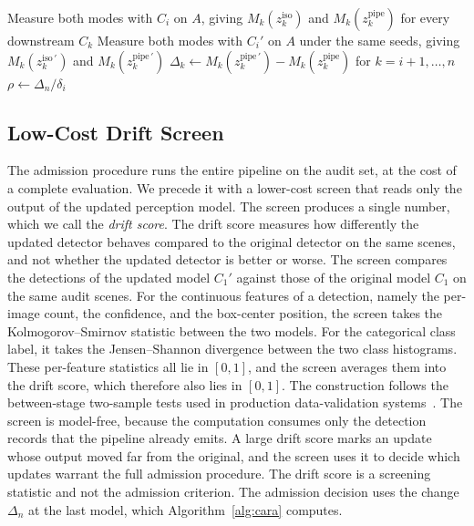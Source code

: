 \documentclass[conference]{IEEEtran}
\begin{document}
\begin{algorithm}[htbp]
\SetAlgoLined
\DontPrintSemicolon
{}
Measure both modes with $C_i$ on $A$, giving $M_k(z_k^{\text{iso}})$ and
$M_k(z_k^{\text{pipe}})$ for every downstream $C_k$\;
Measure both modes with $C_i'$ on $A$ under the same seeds, giving
$M_k(z_k^{\text{iso}\,\prime})$ and $M_k(z_k^{\text{pipe}\,\prime})$\;
$\Delta_k \leftarrow M_k(z_k^{\text{pipe}\,\prime}) - M_k(z_k^{\text{pipe}})$
\quad for $k=i{+}1,\dots,n$\;
$\rho \leftarrow \Delta_n / \delta_i$\;
\caption{Cascade-Aware Retraining Assessment (CARA)}
\label{alg:cara}
\end{algorithm}

\subsection{Low-Cost Drift Screen}
\label{sec:cara-frontend}
The admission procedure runs the entire pipeline on the audit set, at the cost of a
complete evaluation. We precede it with a lower-cost screen that reads only the
output of the updated perception model. The screen produces a single number, which
we call the \emph{drift score}. The drift score measures how differently the
updated detector behaves compared to the original detector on the same scenes, and
not whether the updated detector is better or worse. The screen compares the detections of the
updated model $C_1'$ against those of the original model $C_1$ on the same audit
scenes. For the continuous features of a detection, namely the per-image count, the
confidence, and the box-center position, the screen takes the Kolmogorov--Smirnov
statistic between the two models. For the categorical class label, it takes the
Jensen--Shannon divergence between the two class histograms. These per-feature
statistics all lie in $[0,1]$, and the screen averages them into the drift score,
which therefore also lies in $[0,1]$. The construction follows the between-stage
two-sample tests used in production data-validation
systems~\cite{breck2019data}. The screen is model-free, because the computation
consumes only the detection records that the pipeline already emits. A large drift score marks an
update whose output moved far from the original, and the screen uses it to decide
which updates warrant the full admission procedure. The drift score is a screening
statistic and not the admission criterion. The admission decision uses the change
$\Delta_n$ at the last model, which Algorithm~\ref{alg:cara} computes.
\end{document}
